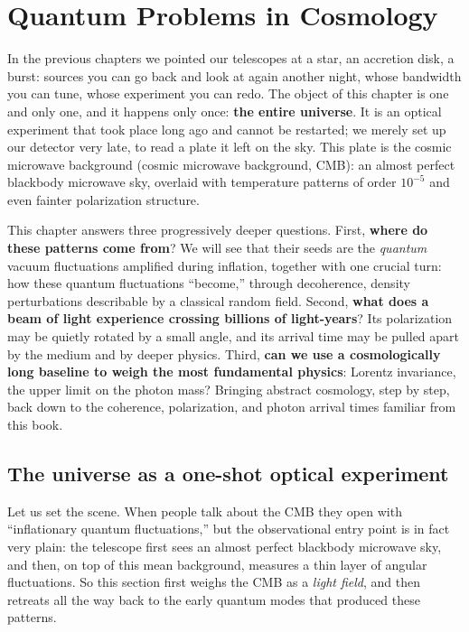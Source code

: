 \chapter{Quantum Problems in Cosmology}
\label{chap:e23}

\begin{chapteropening}
In the previous chapters we pointed our telescopes at a star, an accretion disk, a burst: sources you can go back and look at again another night, whose bandwidth you can tune, whose experiment you can redo. The object of this chapter is one and only one, and it happens only once: \textbf{the entire universe}. It is an optical experiment that took place long ago and cannot be restarted; we merely set up our detector very late, to read a plate it left on the sky. This plate is the cosmic microwave background (cosmic microwave background, CMB): an almost perfect blackbody microwave sky, overlaid with temperature patterns of order \(10^{-5}\) and even fainter polarization structure.

This chapter answers three progressively deeper questions. First, \textbf{where do these patterns come from}? We will see that their seeds are the \emph{quantum} vacuum fluctuations amplified during inflation, together with one crucial turn: how these quantum fluctuations ``become,'' through decoherence, density perturbations describable by a classical random field. Second, \textbf{what does a beam of light experience crossing billions of light-years}? Its polarization may be quietly rotated by a small angle, and its arrival time may be pulled apart by the medium and by deeper physics. Third, \textbf{can we use a cosmologically long baseline to weigh the most fundamental physics}: Lorentz invariance, the upper limit on the photon mass? Bringing abstract cosmology, step by step, back down to the coherence, polarization, and photon arrival times familiar from this book.
\end{chapteropening}

\section{The universe as a one-shot optical experiment}
\label{sec:e23-lightfield}

Let us set the scene. When people talk about the CMB they open with ``inflationary quantum fluctuations,'' but the observational entry point is in fact very plain: the telescope first sees an almost perfect blackbody microwave sky, and then, on top of this mean background, measures a thin layer of angular fluctuations. So this section first weighs the CMB as a \emph{light field}, and then retreats all the way back to the early quantum modes that produced these patterns.

